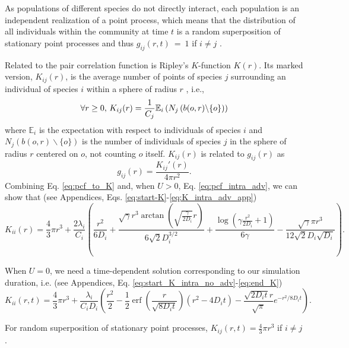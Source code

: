 \documentclass[english]{article}
\DeclareMathOperator\erf{erf}
\begin{document}
As populations of different species do not directly interact, each
population is an independent realization of a point process, which
means that the distribution of all individuals within the community
at time $t$ is a random superposition of stationary point processes
and thus $g_{ij}(r,t)~=~1$ if $i\neq j$ \citep[ p. 326, eq. 5.3.13]{illian2008statistical}.\medskip{}

Related to the pair correlation function is Ripley's $K$-function
$K(r)$. Its marked version, $K_{ij}(r)$, is the average number of
points of species $j$ surrounding an individual of species $i$ within
a sphere of radius $r$ \citep{illian2008statistical}, i.e.,
\begin{equation}
\forall r\geq0\textmd{, }K_{ij}(r)=\frac{1}{C_{j}}\mathbb{E}_{i}\left(N_{j}\left(b(o,r)\backslash\{o\}\right)\right)
\end{equation}
where $\mathbb{E}_{i}$ is the expectation with respect to individuals
of species $i$ and $N_{j}\left(b(o,r)\backslash\{o\}\right)$ is
the number of individuals of species $j$ in the sphere of radius
$r$ centered on $o$, not counting $o$ itself. $K_{ij}(r)$ is related
to $g_{ij}(r)$ as
\begin{equation}
g_{ij}(r)=\frac{K_{ij}'(r)}{4\pi r^{2}}.\label{eq:pcf_to_K}
\end{equation}
Combining Eq. \ref{eq:pcf_to_K} and, when $U>0$, Eq. \ref{eq:pcf_intra_adv},
we can show that (see Appendices, Eqs. \ref{eq:start-K}-\ref{eq:K_intra_adv_app})
\begin{equation}
K_{ii}(r)=\frac{4}{3}\pi r^{3}+\frac{2\lambda_i}{C_{i}}\left(\frac{r^{2}}{6D_i}+\frac{\sqrt{\gamma}r^{3}\arctan(\sqrt{\frac{\gamma}{2D_i}}r)}{6\sqrt{2}D_i^{3/2}}+\frac{\log\left(\gamma\frac{r^{2}}{2D_i}+1\right)}{6\gamma}-\frac{\sqrt{\gamma}\pi r^{3}}{12\sqrt{2}D_i\sqrt{D_i}}\right).\label{eq:K_intra_adv}
\end{equation}

When $U=0$, we need a time-dependent solution corresponding to our
simulation duration, i.e. (see Appendices, Eq. \ref{eq:start_K_intra_no_adv}-\ref{eq:end_K})
\begin{equation}
K_{ii}(r,t)=\frac{4}{3}\pi r^{3}+\frac{\lambda_i}{C_{i}D_i}\left(\frac{r^{2}}{2}-\frac{1}{2}\erf(\frac{r}{\sqrt{8D_i t}})(r^{2}-4D_i t)-\frac{\sqrt{2D_i t}r}{\sqrt{\pi}}e^{-r^{2}/8D_i t}\right).\label{eq:K_intra_no_adv}
\end{equation}

For random superposition of stationary point processes, $K_{ij}(r,t)=\frac{4}{3}\pi r^{3}$
if $i\neq j$ \citep[p. 324, eq. 5.3.5]{illian2008statistical}.
\end{document}
